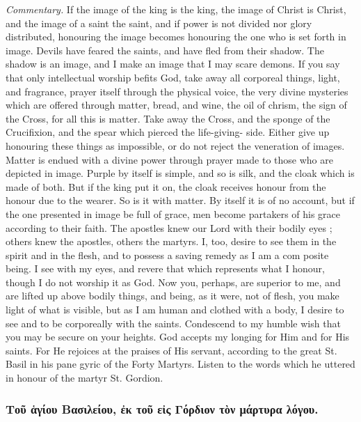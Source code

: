 \documentclass[10pt]{book}
\newcommand{\switchgreek}[1][]{\selectlanguage{polutonikogreek} \switchcolumn*[#1]}
\begin{document}
\begin{paracol}{2}
\emph{Commentary.}
If the image of the king is 
the king, the image of Christ is Christ, and 
the image of a saint the saint, and if power 
is not divided nor glory distributed, honouring 
the image becomes honouring the one who is 
set forth in image. Devils have feared the 
saints, and have fled from their shadow. The 
shadow is an image, and I make an image 
that I may scare demons. If you say that 
only intellectual worship befits God, take away 
all corporeal things, light, and fragrance, prayer 
itself through the physical voice, the very divine 
mysteries which are offered through matter, 
bread, and wine, the oil of chrism, the sign of 
the Cross, for all this is matter. Take away 
the Cross, and the sponge of the Crucifixion, 
and the spear which pierced the life-giving- 
side. Either give up honouring these things 
as impossible, or do not reject the veneration 
of images. Matter is endued with a divine 
power through prayer made to those who are 
depicted in image. Purple by itself is simple, 
and so is silk, and the cloak which is made of 
both. But if the king put it on, the cloak 
receives honour from the honour due to the 
wearer. So is it with matter. By itself it is of 
no account, but if the one presented in image be 
full of grace, men become partakers of his grace 
according to their faith. The apostles knew 
our Lord with their bodily eyes ; others knew 
the apostles, others the martyrs. I, too, desire 
to see them in the spirit and in the flesh, and 
to possess a saving remedy as I am a com 
posite being. I see with my eyes, and revere 
that which represents what I honour, though I 
do not worship it as God. Now you, perhaps, 
are superior to me, and are lifted up above 
bodily things, and being, as it were, not of 
flesh, you make light of what is visible, but 
as I am human and clothed with a body, I 
desire to see and to be corporeally with the 
saints. Condescend to my humble wish that 
you may be secure on your heights. God 
accepts my longing for Him and for His saints. 
For He rejoices at the praises of His servant, 
according to the great St. Basil in his pane 
gyric of the Forty Martyrs. Listen to the 
words which he uttered in honour of the martyr 
St. Gordion. 

\switchgreek

\subsubsection*{Τοῦ ἁγίου Βασιλείου, ἐκ τοῦ εἰς Γόρδιον τὸν μάρτυρα λόγου.}


\end{paracol}
\end{document}

